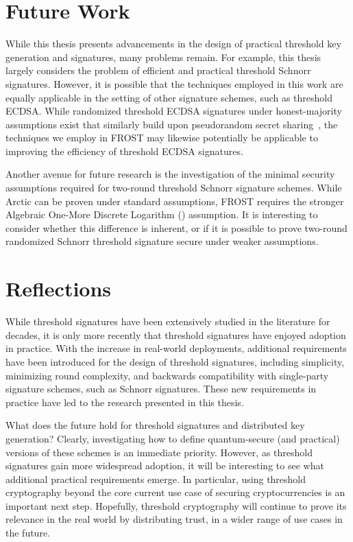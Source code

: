 \section{Future Work}

While this thesis presents advancements in the design of practical threshold key generation and signatures,
many problems remain.
For example, this thesis largely considers the problem of efficient and practical threshold Schnorr signatures.
However, it is possible that the techniques employed in this work are equally applicable in the setting of other signature schemes,
such as threshold ECDSA.
While randomized threshold ECDSA signatures under honest-majority assumptions exist that similarly build upon pseudorandom secret sharing~\cite{DamgardJNPO22,DoernerKLS23,DalskovOKSS20},
the techniques we employ in FROST may likewise potentially be applicable to improving the efficiency of threshold ECDSA signatures.

Another avenue for future research is the investigation of the minimal security
assumptions required for two-round threshold Schnorr signature schemes.
While Arctic can be proven under standard assumptions,
FROST requires the stronger Algebraic One-More Discrete Logarithm (\AOMDL)
assumption.
It is interesting to consider whether this difference is inherent,
or if it is possible to prove two-round randomized Schnorr threshold signature
secure under weaker assumptions.

\section{Reflections}

While threshold signatures have been extensively studied in the literature for decades,
it is only more recently that threshold signatures have enjoyed adoption in practice.
With the increase in real-world deployments,
additional requirements have been introduced for the design of threshold signatures,
including simplicity,
minimizing round complexity,
and backwards compatibility with single-party signature schemes,
such as Schnorr signatures.
These new requirements in practice have led to the research presented in this thesis.

\begin{sloppypar}
What does the future hold for threshold signatures and distributed key generation?
Clearly,
investigating how to define quantum-secure (and practical) versions
of these schemes is an immediate priority.
However,
as threshold signatures gain more widespread adoption,
it will be interesting to see what additional practical requirements emerge.
In particular,
using threshold cryptography beyond the core current use case of securing cryptocurrencies
is an important next step.
Hopefully,
threshold cryptography will continue to prove its relevance in the real world by distributing trust,
in a wider range of use cases in the future.
\end{sloppypar}



